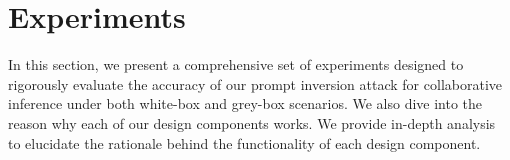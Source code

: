 \begin{table}[t]
\centering
{}
\caption{Evaluation on different components in our method on Skytrax~\cite{skytrax} dataset.  ``Constrained optimization + adaptive discretization" is our final solution.  }
\label{tab:contribution_results}
\vspace{-1em}
\end{table}

\section{Experiments}
In this section, we present a comprehensive set of experiments designed to rigorously evaluate the accuracy of our prompt inversion attack for collaborative inference under both white-box and grey-box scenarios. We also dive into the reason why each of our design components works. We provide in-depth analysis to elucidate the rationale behind the functionality of each design component.

